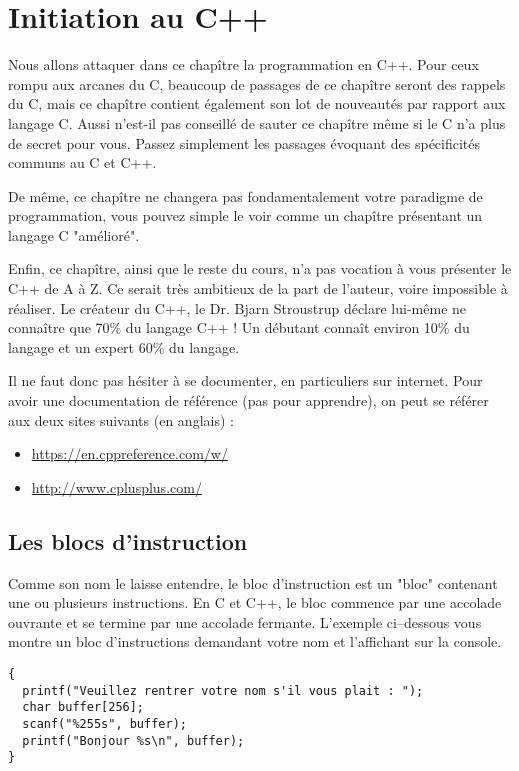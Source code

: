 \chapter{Initiation au C++}

Nous allons attaquer dans ce chapître la programmation en C++. Pour ceux rompu aux arcanes du C, beaucoup de passages
de ce chapître seront des rappels du C, mais ce chapître contient également son lot de nouveautés par rapport aux
langage C. Aussi n'est-il pas conseillé de sauter ce chapître même si le C n'a plus de secret pour vous. Passez simplement les passages évoquant des spécificités communs au C et C++.

De même, ce chapître ne changera pas fondamentalement votre paradigme de programmation, vous pouvez simple le voir comme un chapître présentant un langage C "amélioré".

Enfin, ce chapître, ainsi que le reste du cours, n'a pas vocation à vous présenter le C++ de A à Z. Ce serait très ambitieux de la part de l'auteur, voire impossible à réaliser. Le créateur du C++, le Dr. Bjarn Stroustrup déclare lui-même ne connaître que 70\% du langage C++ ! Un débutant connaît environ 10\% du langage et un expert 60\% du langage.

Il ne faut donc pas hésiter à se documenter, en particuliers sur internet. Pour avoir une documentation de référence (pas pour apprendre), on peut se référer aux deux sites suivants (en anglais) :

\begin{itemize}
    \item \url{https://en.cppreference.com/w/}
    \item \url{http://www.cplusplus.com/}
\end{itemize}

\section{Les blocs d'instruction}

Comme son nom le laisse entendre, le bloc d'instruction est un "bloc" contenant une ou plusieurs instructions. En C et C++, le bloc commence par une accolade ouvrante et se termine par une accolade fermante. L'exemple ci--dessous vous montre un bloc d'instructions demandant votre nom et l'affichant sur la console.

\begin{lstlisting}[caption=Exemple de bloc d'instructions]
{
  printf("Veuillez rentrer votre nom s'il vous plait : ");
  char buffer[256];
  scanf("%255s", buffer);
  printf("Bonjour %s\n", buffer);
}
\end{lstlisting}

